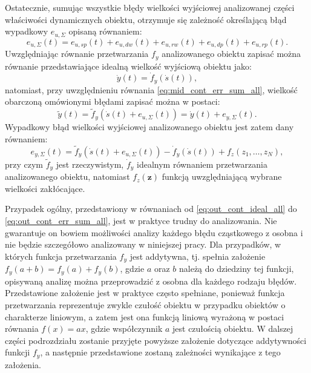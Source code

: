 Ostatecznie, sumując wszystkie błędy wielkości wyjściowej analizowanej części właściwości dynamicznych obiektu, otrzymuje się zależność określającą błąd wypadkowy $e_{u,\Sigma}$ opisaną równaniem:
\begin{equation}
e_{u,\Sigma} \left( t \right) = e_{u,sp} \left( t \right) + e_{u,dw} \left( t \right) + e_{u,rw} \left( t \right) + e_{u,dp} \left( t \right) + e_{u,rp} \left( t \right) \label{eq:mid_cont_err_sum_all}.
\end{equation}
Uwzględniając równanie przetwarzania $f_{y}$ analizowanego obiektu zapisać można równanie przedstawiające idealną wielkość wyjściową obiektu jako:
\begin{equation}
\dot{y} \left( t \right) = \dot{f}_{y} \left( \dot{s} \left( t \right) \right) \label{eq:out_cont_ideal_all},
\end{equation}
natomiast, przy uwzględnieniu równania \eqref{eq:mid_cont_err_sum_all}, wielkość obarczoną omówionymi błędami zapisać można w postaci:
\begin{equation}
\tilde{y} \left( t \right) = \tilde{f}_{y} \left( \dot{s} \left( t \right) + e_{u,\Sigma} \left( t \right) \right) = \dot{y} \left( t \right) + e_{y,\Sigma} \left( t \right) \label{eq:out_cont_real_all}.
\end{equation}
Wypadkowy błąd wielkości wyjściowej analizowanego obiektu jest zatem dany równaniem:
\begin{equation}
e_{y,\Sigma} \left( t \right) = \tilde{f}_{y} \left( \dot{s} \left( t \right) + e_{u,\Sigma} \left( t \right) \right) - \dot{f}_{y} \left( \dot{s} \left( t \right) \right) + f_{z} \left( z_{1}, \hdots, z_{N} \right) \label{eq:out_cont_err_sum_all},
\end{equation}
przy czym $\tilde{f}_{y}$ jest rzeczywistym, $\dot{f}_{y}$ idealnym równaniem przetwarzania analizowanego obiektu, natomiast $f_{z}(\mathbf{z})$ funkcją uwzględniającą wybrane wielkości zakłócające.

Przypadek ogólny, przedstawiony w równaniach od \eqref{eq:out_cont_ideal_all} do \eqref{eq:out_cont_err_sum_all}, jest w praktyce trudny do analizowania. Nie gwarantuje on bowiem możliwości analizy każdego błędu cząstkowego z osobna i nie będzie szczegółowo analizowany w niniejszej pracy. Dla przypadków, w których funkcja przetwarzania $f_{y}$ jest addytywna, tj. spełnia założenie $f_{y}(a + b) = f_{y}(a) + f_{y}(b)$, gdzie $a$ oraz $b$ należą do dziedziny tej funkcji, opisywaną analizę można przeprowadzić z osobna dla każdego rodzaju błędów. Przedstawione założenie jest w praktyce często spełniane, ponieważ funkcja przetwarzania reprezentuje zwykle czułość obiektu w przypadku obiektów o charakterze liniowym, a zatem jest ona funkcją liniową wyrażoną w postaci równania $f(x) = ax$, gdzie współczynnik $a$ jest czułością obiektu. W dalszej części podrozdziału zostanie przyjęte powyższe założenie dotyczące addytywności funkcji $f_{y}$, a następnie przedstawione zostaną zależności wynikające z tego założenia.

